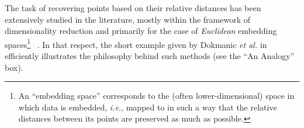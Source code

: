 The task of recovering points based on their relative distances has been extensively studied in the literature, mostly within the framework of dimensionality reduction and primarily for the case of \textit{Euclidean} embedding spaces\footnote{An ``embedding space'' corresponds to the (often lower-dimensional) space in which data is embedded, \textit{i.e.}, mapped to in such a way that the relative distances between its points are preserved as much as possible.}~\cite{belkin2003laplacian,kruskal1978multidimensional, maaten2008visualizing, mcinnes2018umap,dokmanic2015euclidean} . In that respect, the short example given by Dokmanic \textit{et al.} in~\cite{dokmanic2015euclidean} efficiently illustrates the philosophy behind such methods (see the ``An Analogy'' box). \\

